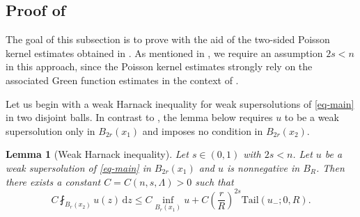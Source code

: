 \documentclass[11pt]{amsart}
\theoremstyle{plain}
\newtheorem{lemma}[theorem]{Lemma}
\theoremstyle{definition}
\numberwithin{equation}{section}
\begin{document}
\subsection{Proof of }
The goal of this subsection is to prove  with the aid of the two-sided Poisson kernel estimates obtained in . As mentioned in , we require an assumption $2s<n$ in this approach, since the Poisson kernel estimates strongly rely on the associated Green function estimates in the context of \cite{KLL23, KW24b}. 

Let us begin with a weak Harnack inequality for weak supersolutions of \eqref{eq-main} in two disjoint balls. In contrast to , the lemma below requires $u$ to be a weak supersolution only in $B_{2r}(x_1)$ and imposes no condition in $B_{2r}(x_2)$.

\begin{lemma}[Weak Harnack inequality]\label{lem-WHI}
Let $s \in (0, 1)$ with $2s<n$. Let $u$ be a weak supersolution of \eqref{eq-main} in $B_{2r}(x_1)$ and $u$ is nonnegative in $B_{R}$. Then there exists a constant $C=C(n, s, \Lambda)>0$ such that
     \begin{equation}\label{eq-WHI}
        C \fint_{B_r(x_2)}u(z)\,\mathrm{d}z \leq C\inf_{B_r(x_1)}u+C\left(\frac{r}{R}\right)^{2s}\mathrm{Tail}(u_-; 0, R).
    \end{equation}
\end{lemma}
\end{document}
